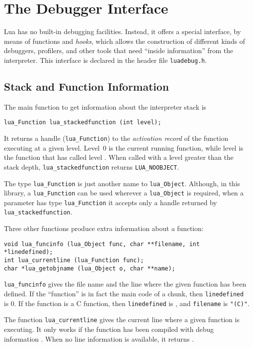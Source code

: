 \section{The Debugger Interface} \label{debugI}

Lua has no built-in debugging facilities.
Instead, it offers a special interface,
by means of functions and \emph{hooks},
which allows the construction of different
kinds of debuggers, profilers, and other tools
that need ``inside information'' from the interpreter.
This interface is declared in the header file \verb|luadebug.h|.

\subsection{Stack and Function Information}

The main function to get information about the interpreter stack
is
\begin{verbatim}
lua_Function lua_stackedfunction (int level);
\end{verbatim}
It returns a handle (\verb|lua_Function|) to the \emph{activation record}
of the function executing at a given level.
Level~0 is the current running function,
while level  is the function that has called level .
When called with a level greater than the stack depth,
\verb|lua_stackedfunction| returns \verb|LUA_NOOBJECT|.

The type \verb|lua_Function| is just another name
to \verb|lua_Object|.
Although, in this library,
a \verb|lua_Function| can be used wherever a \verb|lua_Object| is required,
when a parameter has type \verb|lua_Function|
it accepts only a handle returned by
\verb|lua_stackedfunction|.

Three other functions produce extra information about a function:
\begin{verbatim}
void lua_funcinfo (lua_Object func, char **filename, int *linedefined);
int lua_currentline (lua_Function func);
char *lua_getobjname (lua_Object o, char **name);
\end{verbatim}
\verb|lua_funcinfo| gives the file name and the line where the
given function has been defined.
If the ``function'' is in fact the main code of a chunk,
then \verb|linedefined| is 0.
If the function is a C function,
then \verb|linedefined| is , and \verb|filename| is \verb|"(C)"|.

The function \verb|lua_currentline| gives the current line where
a given function is executing.
It only works if the function has been compiled with debug
information .
When no line information is available, it returns .

